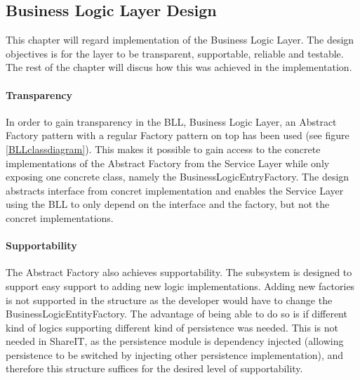 \documentclass[../report.tex]{subfiles}
\begin{document}
\graphicspath{{img/}{../img/}}

\subsection{Business Logic Layer Design}

This chapter will regard implementation of the Business Logic Layer. The design objectives is for the layer to be transparent, supportable, reliable and testable. The rest of the chapter will discus how this was achieved in the implementation. 

\paragraph{Transparency}
In order to gain transparency in the BLL, Business Logic Layer, an Abstract Factory pattern with a regular Factory pattern on top has been used (see figure \ref{BLLclassdiagram}). This makes it possible to gain access to the concrete implementations of the Abstract Factory from the Service Layer while only exposing one concrete class, namely the BusinessLogicEntryFactory. The design abstracts interface from concret implementation and enables the Service Layer using the BLL to only depend on the interface and the factory, but not the concret implementations.





\paragraph{Supportability} The Abstract Factory also achieves supportability.
The subsystem is designed to support easy support to adding new logic
implementations. Adding new factories is not supported in the structure as the
developer would have to change the BusinessLogicEntityFactory. The advantage
of being able to do so is if different kind of logics supporting different
kind of persistence was needed. This is not needed in ShareIT, as the
persistence module is dependency injected (allowing persistence to be switched
by injecting other persistence implementation), and therefore this structure
suffices for the desired level of supportability.
\end{document}
